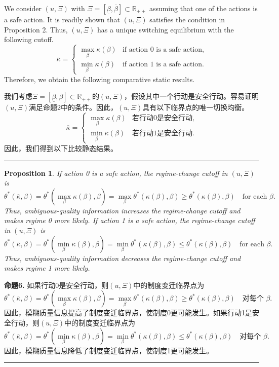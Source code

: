 \documentclass[12pt,a4paper]{article}
\newenvironment{original}
  {\par\medskip\noindent\color{black}\ignorespaces}
  {\par\medskip}
\newenvironment{translation}
  {\par\noindent\color{darkblue}\ignorespaces}
  {\par\medskip\noindent\hrule\par\medskip}
\newtheorem{proposition}[theorem]{Proposition}
\theoremstyle{definition}
\theoremstyle{remark}
\begin{document}
\begin{original}
We consider $(u, \Xi)$ with $\Xi = [\underline{\beta}, \overline{\beta}] \subset \mathbb{R}_{++}$ assuming that one of the actions is a safe action. It is readily shown that $(u, \Xi)$ satisfies the condition in Proposition 2. Thus, $(u, \Xi)$ has a unique switching equilibrium with the following cutoff.
\[
\overline{\kappa} =
\begin{cases}
\max_{\beta} \kappa(\beta) & \text{if action 0 is a safe action},\\[4pt]
\min_{\beta} \kappa(\beta) & \text{if action 1 is a safe action}.
\end{cases}
\tag{14}
\]
Therefore, we obtain the following comparative static results.
\end{original}
\begin{translation}
我们考虑$\Xi = [\underline{\beta}, \overline{\beta}] \subset \mathbb{R}_{++}$的$(u, \Xi)$，假设其中一个行动是安全行动。容易证明$(u, \Xi)$满足命题2中的条件。因此，$(u, \Xi)$具有以下临界点的唯一切换均衡。
\[
\overline{\kappa} =
\begin{cases}
\max_{\beta} \kappa(\beta) & \text{若行动0是安全行动},\\[4pt]
\min_{\beta} \kappa(\beta) & \text{若行动1是安全行动}.
\end{cases}
\tag{14}
\]
因此，我们得到以下比较静态结果。
\end{translation}

\begin{proposition}
If action 0 is a safe action, the regime-change cutoff in $(u, \Xi)$ is
\[
\theta^*(\overline{\kappa}, \beta) = \theta^*(\max_{\beta} \kappa(\beta), \beta) = \max_{\beta} \theta^*(\kappa(\beta), \beta) \ge \theta^*(\kappa(\beta), \beta) \quad \text{for each } \beta.
\]
Thus, ambiguous-quality information increases the regime-change cutoff and makes regime 0 more likely. If action 1 is a safe action, the regime-change cutoff in $(u, \Xi)$ is
\[
\theta^*(\overline{\kappa}, \beta) = \theta^*(\min_{\beta} \kappa(\beta), \beta) = \min_{\beta} \theta^*(\kappa(\beta), \beta) \le \theta^*(\kappa(\beta), \beta) \quad \text{for each } \beta.
\]
Thus, ambiguous-quality information decreases the regime-change cutoff and makes regime 1 more likely.
\end{proposition}
\begin{translation}
\color{darkblue}\textbf{命题6.} 如果行动0是安全行动，则$(u, \Xi)$中的制度变迁临界点为
\[
\theta^*(\overline{\kappa}, \beta) = \theta^*(\max_{\beta} \kappa(\beta), \beta) = \max_{\beta} \theta^*(\kappa(\beta), \beta) \ge \theta^*(\kappa(\beta), \beta) \quad \text{对每个 } \beta.
\]
因此，模糊质量信息提高了制度变迁临界点，使制度0更可能发生。如果行动1是安全行动，则$(u, \Xi)$中的制度变迁临界点为
\[
\theta^*(\overline{\kappa}, \beta) = \theta^*(\min_{\beta} \kappa(\beta), \beta) = \min_{\beta} \theta^*(\kappa(\beta), \beta) \le \theta^*(\kappa(\beta), \beta) \quad \text{对每个 } \beta.
\]
因此，模糊质量信息降低了制度变迁临界点，使制度1更可能发生。
\end{translation}
\end{document}
